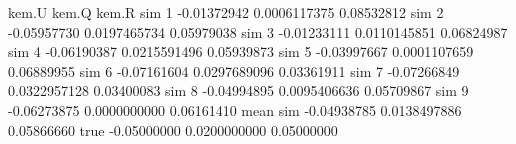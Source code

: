 \begin{Schunk}
\begin{Soutput}
               kem.U        kem.Q      kem.R
sim 1    -0.01372942 0.0006117375 0.08532812
sim 2    -0.05957730 0.0197465734 0.05979038
sim 3    -0.01233111 0.0110145851 0.06824987
sim 4    -0.06190387 0.0215591496 0.05939873
sim 5    -0.03997667 0.0001107659 0.06889955
sim 6    -0.07161604 0.0297689096 0.03361911
sim 7    -0.07266849 0.0322957128 0.03400083
sim 8    -0.04994895 0.0095406636 0.05709867
sim 9    -0.06273875 0.0000000000 0.06161410
mean sim -0.04938785 0.0138497886 0.05866660
true     -0.05000000 0.0200000000 0.05000000
\end{Soutput}
\end{Schunk}
